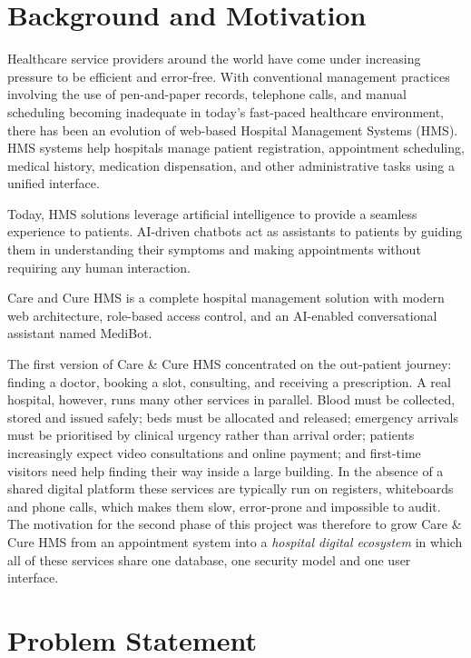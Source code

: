 \FloatBarrier
\section{Background and Motivation}

Healthcare service providers around the world have come under increasing pressure to be efficient and error-free. With conventional management practices involving the use of pen-and-paper records, telephone calls, and manual scheduling becoming inadequate in today's fast-paced healthcare environment, there has been an evolution of web-based Hospital Management Systems (HMS). HMS systems help hospitals manage patient registration, appointment scheduling, medical history, medication dispensation, and other administrative tasks using a unified interface.

Today, HMS solutions leverage artificial intelligence to provide a seamless experience to patients. AI-driven chatbots act as assistants to patients by guiding them in understanding their symptoms and making appointments without requiring any human interaction.

Care and Cure HMS is a complete hospital management solution with modern web architecture, role-based access control, and an AI-enabled conversational assistant named MediBot.

The first version of Care \& Cure HMS concentrated on the out-patient journey: finding a doctor, booking a slot, consulting, and receiving a prescription. A real hospital, however, runs many other services in parallel. Blood must be collected, stored and issued safely; beds must be allocated and released; emergency arrivals must be prioritised by clinical urgency rather than arrival order; patients increasingly expect video consultations and online payment; and first-time visitors need help finding their way inside a large building. In the absence of a shared digital platform these services are typically run on registers, whiteboards and phone calls, which makes them slow, error-prone and impossible to audit. The motivation for the second phase of this project was therefore to grow Care \& Cure HMS from an appointment system into a \emph{hospital digital ecosystem} in which all of these services share one database, one security model and one user interface.

\FloatBarrier
\section{Problem Statement}

